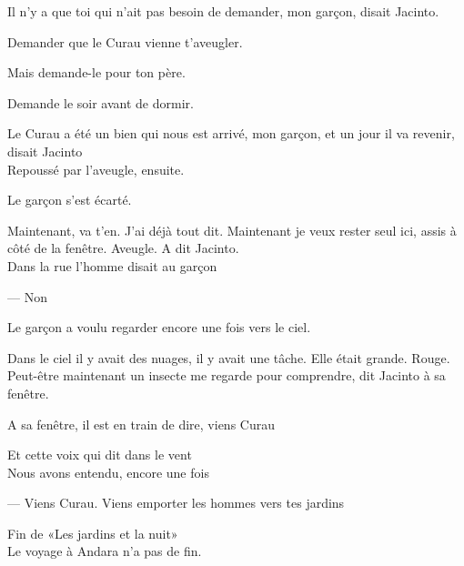 Il n'y a que toi qui n'ait pas besoin de demander, mon garçon, disait
Jacinto.

Demander que le Curau vienne t'aveugler.

Mais demande-le pour ton père.

Demande le soir avant de dormir.

Le Curau a été un bien qui nous est arrivé, mon garçon, et un jour il va
revenir, disait Jacinto\\

Repoussé par l'aveugle, ensuite.

Le garçon s'est écarté.

Maintenant, va t'en. J'ai déjà tout dit. Maintenant je veux rester seul
ici, assis à côté de la fenêtre. Aveugle. A dit Jacinto.\\

Dans la rue l'homme disait au garçon

--- Non

Le garçon a voulu regarder encore une fois vers le ciel.

Dans le ciel il y avait des nuages, il y avait une tâche. Elle était
grande. Rouge.\\

Peut-être maintenant un insecte me regarde pour comprendre, dit Jacinto
à sa fenêtre.

A sa fenêtre, il est en train de dire, viens Curau

\breakk

\vspace*{4cm}

Et cette voix qui dit dans le vent\\

Nous avons entendu, encore une fois

--- Viens Curau. Viens emporter les hommes vers tes jardins

\vfill
Fin de «Les jardins et la nuit»\\

Le voyage à Andara n'a pas de fin.